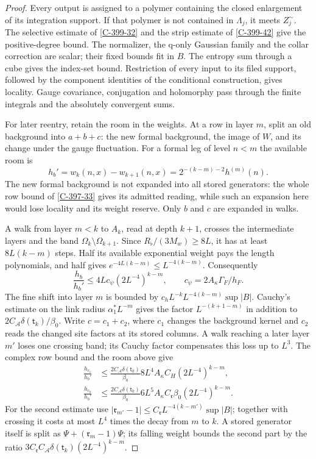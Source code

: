 \documentclass[11pt,letterpaper,reqno]{amsart}
\theoremstyle{definition}
\theoremstyle{remark}
\begin{document}
\begin{proof}
Every output is assigned to a polymer containing the
closed enlargement of its integration support. If that
polymer is not contained in $\Lambda_j$, it meets
$Z_j^\sim$. The selective estimate of \cref{C-399-32}
and the strip estimate of \cref{C-399-42} give the
positive-degree bound. The normalizer, the q-only
Gaussian family and the collar correction are scalar;
their fixed bounds fit in $B$. The entropy sum through
a cube gives the index-set bound. Restriction of every
input to its filed support, followed by the component
identities of the conditional construction, gives
locality. Gauge covariance, conjugation and holomorphy
pass through the finite integrals and the absolutely
convergent sums.

For later reentry, retain the room in the weights.
At a row in layer $m$, split an old background into
$a+b+c$: the new formal background, the image of $W$,
and its change under the gauge fluctuation. For a
formal leg of level $n<m$ the available room is
\[
 h_b'=w_k(n,x)-w_{k+1}(n,x)
       =2^{-(k-m)-2}h^{(m)}(n).
\]
The new formal background is not expanded into all
stored generators: the whole row bound of
\cref{C-397-33} gives its admitted reading, while such
an expansion here would lose locality and its weight
reserve. Only $b$ and $c$ are expanded in walks.

A walk from layer $m<k$ to $A_k$, read at depth $k+1$,
crosses the intermediate layers and the band
$\Omega_k\setminus\Omega_{k+1}$. Since
$R_\flat/(3M_w)\ge8L$, it has at least $8L(k-m)$
steps. Half its available exponential weight pays
the length polynomials, and half gives
$e^{-4L(k-m)}\le L^{-4(k-m)}$. Consequently
\[
 \frac{h_b}{h_b'}\le4Lc_\psi(2L^{-4})^{k-m},
 \qquad c_\psi=2A_\kappa\Gamma_F/h_F .
\]
The fine shift into layer $m$ is bounded by
$c_hL^{-k}L^{-4(k-m)}\sup|B|$. Cauchy's estimate on
the link radius $\alpha_1^*L^{-m}$ gives the factor
$L^{-(k+1-m)}$ in addition to
$2C_{\mathcal A}\delta(\mathsf t_k)/\beta_0$.
Write $c=c_1+c_2$, where $c_1$ changes the background
kernel and $c_2$ reads the changed site factors at
its stored columns. A walk reaching a later layer
$m'$ loses one crossing band; its Cauchy factor
compensates this loss up to $L^3$. The complex row
bound and the room above give
\[
\begin{split}
 \frac{h_{c_1}}{h_b'}&\le
 \frac{2C_{\mathcal A}\delta(\mathsf t_k)}{\beta_0}
      8L^4A_\kappa C_H(2L^{-4})^{k-m},\\
 \frac{h_{c_2}}{h_b'}&\le
 \frac{2C_{\mathcal A}\delta(\mathsf t_k)}{\beta_0}
      6L^5A_\kappa C_{\mathfrak r}\beta_0
                                 (2L^{-4})^{k-m}.
\end{split}
\]
For the second estimate use
$|\mathfrak r_{m'}-1|
 \le C_{\mathfrak r}L^{-4(k-m')}\sup|B|$;
together with crossing it costs at most $L^4$
times the decay from $m$ to $k$.
A stored generator itself is split as
$\Psi+(\mathfrak r_m-1)\Psi$; its falling weight
bounds the second part by the ratio
$3C_{\mathfrak r}C_{\mathcal A}\delta(\mathsf t_k)
(2L^{-4})^{k-m}$.


\end{proof}
\end{document}
